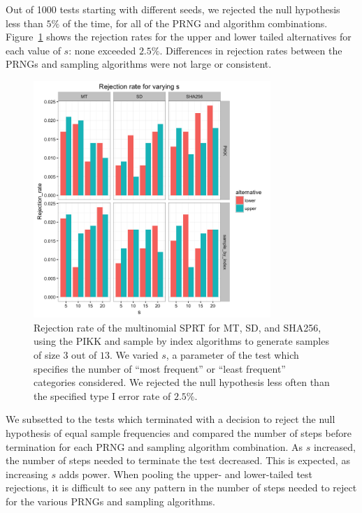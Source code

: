 \documentclass[12pt]{article}
\begin{document}
Out of 1000 tests starting with different seeds, we rejected the null hypothesis less than $5\%$ of the time, for all of the PRNG and algorithm combinations. 
Figure~\ref{fig:multinomial_sprt_rejections} shows the rejection rates for the upper and lower tailed alternatives for each value of $s$: none exceeded $2.5\%$.
Differences in rejection rates between the PRNGs and sampling algorithms were not large or consistent.


\begin{figure}[h]
\begin{center}
\includegraphics[width=0.8\textwidth]{fig/sprt-multinomial-rejection-rate.png}
\caption{Rejection rate of the multinomial SPRT for MT, SD, and SHA256, using the PIKK and sample by index algorithms to generate samples of size $3$ out of $13$. We varied $s$, a parameter of the test which specifies the number of ``most frequent'' or ``least frequent'' categories considered.  We rejected the null hypothesis less often than the specified type I error rate of $2.5\%$.}
\label{fig:multinomial_sprt_rejections}
\end{center}
\end{figure}

We subsetted to the tests which terminated with a decision to reject the null hypothesis of equal sample frequencies and compared the number of steps before termination for each PRNG and sampling algorithm combination. 
As $s$ increased, the number of steps needed to terminate the test decreased. 
This is expected, as increasing $s$ adds power. 
When pooling the upper- and lower-tailed test rejections, it is difficult to see any pattern in the number of steps needed to reject for the various PRNGs and sampling algorithms. 
\end{document}
